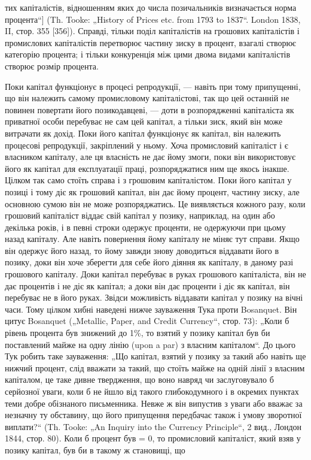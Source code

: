 тих капіталістів, відношенням яких до числа позичальників визначається
норма процента“] (Th. Tooke: „History of Prices etc.
from 1793 to 1837“. London 1838, II, стор. 355 [356]). Справді, тільки
поділ капіталістів на грошових капіталістів і промислових капіталістів
перетворює частину зиску в процент, взагалі створює
категорію процента; і тільки конкуренція між цими двома видами
капіталістів створює розмір процента.

Поки капітал функціонує в процесі репродукції, — навіть при
тому припущенні, що він належить самому промисловому капіталістові,
так що цей останній не повинен повертати його позикодавцеві,
— доти в розпорядженні капіталіста як приватної
особи перебуває не сам цей капітал, а тільки зиск, який він
може витрачати як дохід. Поки його капітал функціонує як
капітал, він належить процесові репродукції, закріплений у ньому.
Хоча промисловий капіталіст і є власником капіталу, але ця власність
не дає йому змоги, поки він використовує його як капітал
для експлуатації праці, розпоряджатися ним ще якось інакше.
Цілком так само стоїть справа і з грошовим капіталістом. Поки
його капітал у позиці і тому діє як грошовий капітал, він
дає йому процент, частину зиску, але основною сумою він не
може розпоряджатись. Це виявляється кожного разу, коли грошовий
капіталіст віддає свій капітал у позику, наприклад, на
один або декілька років, і в певні строки одержує проценти,
не одержуючи при цьому назад капіталу. Але навіть повернення
йому капіталу не міняє тут справи. Якщо він одержує
його назад, то йому завжди знову доводиться віддавати його
в позику, доки він хоче зберегти для себе його діяння як
капіталу, в даному разі грошового капіталу. Доки капітал
перебуває в руках грошового капіталіста, він не дає процентів
і не діє як капітал; а доки він дає проценти і діє як капітал,
він перебуває не в його руках. Звідси можливість
віддавати капітал у позику на вічні часи. Тому цілком хибні
наведені нижче зауваження Тука проти Bosanquet. Він цитує
Bosanquet („Metallic, Paper, and Credit Currency“, стор. 73):
„Коли б рівень процента був знижений до 1\%, то взятий
у позику капітал був би поставлений майже на одну лінію (upon
a par) з власним капіталом“. До цього Тук робить таке зауваження:
„Що капітал, взятий у позику за такий або навіть ще
нижчий процент, слід вважати за такий, що стоїть майже на
одній лінії з власним капіталом, це таке дивне твердження, що
воно навряд чи заслуговувало б серйозної уваги, коли б не
йшло від такого глибокодумного і в окремих пунктах теми
добре обізнаного письменника. Невже ж він випустив з уваги
або вважає за незначну ту обставину, що його припущення
передбачає також і умову зворотної виплати?“ (Th. Tooke: „An
Inquiry into the Currency Principle“, 2 вид., Лондон 1844,
стор. 80). Коли б процент був = 0, то промисловий капіталіст,
який взяв у позику капітал, був би в такому ж становищі, що

